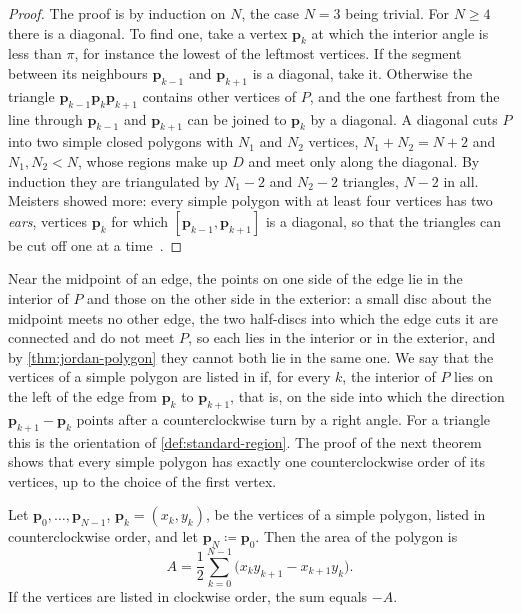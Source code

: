 \begin{proof}
The proof is by induction on $N$, the case $N=3$ being trivial. For $N\ge4$ there is a diagonal. To find one, take a vertex $\mathbf p_k$ at which the interior angle is less than $\pi$, for instance the lowest of the leftmost vertices. If the segment between its neighbours $\mathbf p_{k-1}$ and $\mathbf p_{k+1}$ is a diagonal, take it. Otherwise the triangle $\mathbf p_{k-1}\mathbf p_k\mathbf p_{k+1}$ contains other vertices of $P$, and the one farthest from the line through $\mathbf p_{k-1}$ and $\mathbf p_{k+1}$ can be joined to $\mathbf p_k$ by a diagonal. A diagonal cuts $P$ into two simple closed polygons with $N_1$ and $N_2$ vertices, $N_1+N_2=N+2$ and $N_1,N_2<N$, whose regions make up $D$ and meet only along the diagonal. By induction they are triangulated by $N_1-2$ and $N_2-2$ triangles, $N-2$ in all. Meisters showed more: every simple polygon with at least four vertices has two \emph{ears}, vertices $\mathbf p_k$ for which $[\mathbf p_{k-1},\mathbf p_{k+1}]$ is a diagonal, so that the triangles can be cut off one at a time~\cite{meisters1975}.
\end{proof}

Near the midpoint of an edge, the points on one side of the edge lie in the interior of $P$ and those on the other side in the exterior: a small disc about the midpoint meets no other edge, the two half-discs into which the edge cuts it are connected and do not meet $P$, so each lies in the interior or in the exterior, and by \cref{thm:jordan-polygon} they cannot both lie in the same one. We say that the vertices of a simple polygon are listed in  if, for every $k$, the interior of $P$ lies on the left of the edge from $\mathbf p_k$ to $\mathbf p_{k+1}$, that is, on the side into which the direction $\mathbf p_{k+1}-\mathbf p_k$ points after a counterclockwise turn by a right angle. For a triangle this is the orientation of \cref{def:standard-region}. The proof of the next theorem shows that every simple polygon has exactly one counterclockwise order of its vertices, up to the choice of the first vertex.

\begin{theorem}
\label{thm:shoelace}
Let $\mathbf p_0,\ldots,\mathbf p_{N-1}$, $\mathbf p_k=(x_k,y_k)$, be the vertices of a simple polygon, listed in counterclockwise order, and let $\mathbf p_N\coloneqq\mathbf p_0$. Then the area of the polygon is
\[
A=\frac12\sum_{k=0}^{N-1}\bigl(x_ky_{k+1}-x_{k+1}y_k\bigr).
\]
If the vertices are listed in clockwise order, the sum equals $-A$.
\end{theorem}

